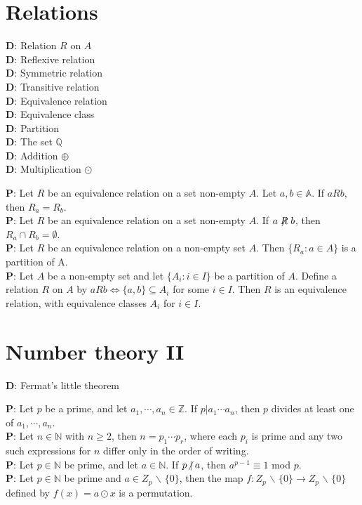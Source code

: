 \documentclass[a4paper]{article}
\begin{document}
\section*{Relations}
\begin{multicols}{3}
	\noindent
	\textbf{D}: Relation $R$ on $A$\\
	\textbf{D}: Reflexive relation\\
	\textbf{D}: Symmetric relation\\
	\textbf{D}: Transitive relation\\
	\textbf{D}: Equivalence relation\\
	\textbf{D}: Equivalence class\\
	\textbf{D}: Partition\\
	\textbf{D}: The set $\mathbb{Q}$\\
	\textbf{D}: Addition $\oplus$\\
	\textbf{D}: Multiplication $\odot$
\end{multicols}
	\noindent
	\textbf{P}: Let $R$ be an equivalence relation on a set non-empty $A$. Let $a, b \in \mathbb{A}$. If $aRb$, then $R_a = R_b$.\\
	\textbf{P}: Let $R$ be an equivalence relation on a set non-empty $A$. If $a\centernot Rb$, then $R_a \cap R_b = \emptyset$.\\
	\textbf{P}: Let $R$ be an equivalence relation on a non-empty set $A$. Then $\{R_a :a \in A\}$ is a partition of A.\\
	\textbf{P}: Let $A$ be a non-empty set and let $\{A_i : i \in I\}$ be a partition of $A$. Define a relation $R$ on $A$ by $aRb\Leftrightarrow \{a,b\}\subseteq A_i$ for some $i\in I$. Then $R$ is an equivalence relation, with equivalence classes $A_i$ for $i \in I$.

\section*{Number theory II}
\begin{multicols}{3}
	\noindent
	\textbf{D}: Fermat's little theorem
\end{multicols}
	\noindent
	\textbf{P}: Let $p$ be a prime, and let $a_1,\cdots ,a_n \in \mathbb{Z}$. If $p|a_1\cdots a_n$, then $p$ divides at least one of $a_1,\cdots,a_n$.\\
	\textbf{P}: Let $n \in \mathbb{N}$ with $n \geq 2$, then $n = p_1\cdots p_r$, where each $p_i$ is prime and any two such expressions for $n$ differ only in the order of writing.\\
	\textbf{P}: Let $p \in \mathbb{N}$ be prime, and let $a \in \mathbb{N}$. If $p \centernot\vert a$, then $a^{p-1} \equiv 1$ mod $p$.\\
	\textbf{P}: Let $p \in \mathbb{N}$ be prime and $a \in Z_p$ $\backslash$ $\{0\}$, then the map $f : Z_p $ $\backslash$ $\{0\} \rightarrow Z_p$ $\backslash$ $\{0\}$ defined by $f (x) = a \odot x$ is a permutation.
\end{document}
